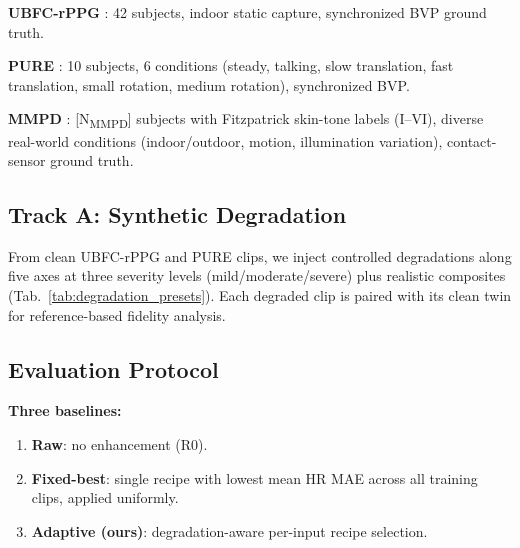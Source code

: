 \documentclass[conference]{IEEEtran}
\begin{document}
\textbf{UBFC-rPPG} \cite{bobbia2019unsupervised}: 42 subjects, indoor static capture, synchronized BVP ground truth.

\textbf{PURE} \cite{stricker2014non}: 10 subjects, 6 conditions (steady, talking, slow translation, fast translation, small rotation, medium rotation), synchronized BVP.

\textbf{MMPD} \cite{niu2023mmpd}: [N\textsubscript{MMPD}] subjects with Fitzpatrick skin-tone labels (I--VI), diverse real-world conditions (indoor/outdoor, motion, illumination variation), contact-sensor ground truth.

\subsection{Track A: Synthetic Degradation}
\label{subsec:tracka}

From clean UBFC-rPPG and PURE clips, we inject controlled degradations along five axes at three severity levels (mild/moderate/severe) plus realistic composites (Tab.~\ref{tab:degradation_presets}). Each degraded clip is paired with its clean twin for reference-based fidelity analysis.

\begin{table}[t]
\centering
\caption{Degradation injection presets.}
\label{tab:degradation_presets}
\end{table}

\subsection{Evaluation Protocol}
\label{subsec:protocol}

\textbf{Three baselines:}
\begin{enumerate}
    \item \textbf{Raw}: no enhancement (R0).
    \item \textbf{Fixed-best}: single recipe with lowest mean HR MAE across all training clips, applied uniformly.
    \item \textbf{Adaptive (ours)}: degradation-aware per-input recipe selection.
\end{enumerate}
\end{document}
